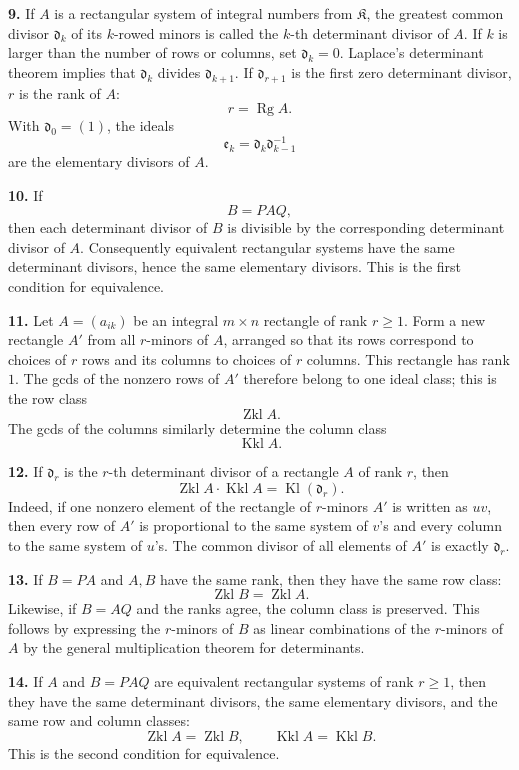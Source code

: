 \documentclass[11pt,a4paper]{article}
\newcommand{\K}{\mathfrak K}
\newcommand{\Kl}{\operatorname{Kl}}
\newcommand{\Zkl}{\operatorname{Zkl}}
\newcommand{\Kkl}{\operatorname{Kkl}}
\newcommand{\Rg}{\operatorname{Rg}}
\begin{document}
\textbf{9.} If \(A\) is a rectangular system of integral numbers from \(\K\), the greatest common divisor \(\mathfrak d_k\) of its \(k\)-rowed minors is called the \(k\)-th determinant divisor of \(A\). If \(k\) is larger than the number of rows or columns, set \(\mathfrak d_k=0\). Laplace's determinant theorem implies that \(\mathfrak d_k\) divides \(\mathfrak d_{k+1}\). If \(\mathfrak d_{r+1}\) is the first zero determinant divisor, \(r\) is the rank of \(A\):
\[
 r=\Rg A.
\]
With \(\mathfrak d_0=(1)\), the ideals
\[
 \mathfrak e_k=\mathfrak d_k\mathfrak d_{k-1}^{-1}
\]
are the elementary divisors of \(A\).

\textbf{10.} If
\[
 B=PAQ,
\]
then each determinant divisor of \(B\) is divisible by the corresponding determinant divisor of \(A\). Consequently equivalent rectangular systems have the same determinant divisors, hence the same elementary divisors. This is the first condition for equivalence.

\textbf{11.} Let \(A=(a_{ik})\) be an integral \(m\times n\) rectangle of rank \(r\geq1\). Form a new rectangle \(A'\) from all \(r\)-minors of \(A\), arranged so that its rows correspond to choices of \(r\) rows and its columns to choices of \(r\) columns. This rectangle has rank \(1\). The gcds of the nonzero rows of \(A'\) therefore belong to one ideal class; this is the row class
\[
 \Zkl A.
\]
The gcds of the columns similarly determine the column class
\[
 \Kkl A.
\]

\textbf{12.} If \(\mathfrak d_r\) is the \(r\)-th determinant divisor of a rectangle \(A\) of rank \(r\), then
\[
 \Zkl A\cdot \Kkl A=\Kl(\mathfrak d_r). \tag{4}
\]
Indeed, if one nonzero element of the rectangle of \(r\)-minors \(A'\) is written as \(uv\), then every row of \(A'\) is proportional to the same system of \(v\)'s and every column to the same system of \(u\)'s. The common divisor of all elements of \(A'\) is exactly \(\mathfrak d_r\).

\textbf{13.} If \(B=PA\) and \(A,B\) have the same rank, then they have the same row class:
\[
 \Zkl B=\Zkl A.
\]
Likewise, if \(B=AQ\) and the ranks agree, the column class is preserved. This follows by expressing the \(r\)-minors of \(B\) as linear combinations of the \(r\)-minors of \(A\) by the general multiplication theorem for determinants.

\textbf{14.} If \(A\) and \(B=PAQ\) are equivalent rectangular systems of rank \(r\geq1\), then they have the same determinant divisors, the same elementary divisors, and the same row and column classes:
\[
 \Zkl A=\Zkl B,\qquad \Kkl A=\Kkl B. \tag{5}
\]
This is the second condition for equivalence.
\end{document}
